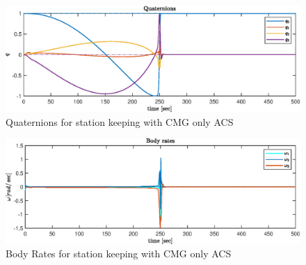 \begin{figure}[H]
     \centering
    \includegraphics[width=0.9\columnwidth]{figures/plots/CMG/cm_reg_w10_q.eps}
    \caption{Quaternions for station keeping with CMG only ACS}
    \label{plt:cm_reg_w10_q}
\end{figure}

\begin{figure}[H]
     \centering
    \includegraphics[width=0.9\columnwidth]{figures/plots/CMG/cm_reg_w10_w.eps}
    \caption{Body Rates for station keeping with CMG only ACS}
    \label{plt:cm_reg_w10_w}
\end{figure}



